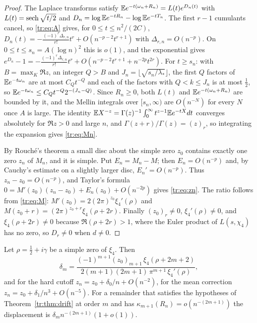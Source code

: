 \begin{proof}
The Laplace transforms satisfy $\mathbb{E} e^{-t(\omega_n+R_n)}=L(t)e^{D_n(t)}$ with $L(t)=\operatorname{sech}\sqrt{t/2}$ and $D_n=\log\mathbb{E} e^{-tR_n}-\log\mathbb{E} e^{-tT_n}$. The first $r-1$ cumulants cancel, so \eqref{tr:eq:A} gives, for $0\le t\le n^2/(2C)$, $D_n(t)=-\frac{(-1)^r\Delta_{r,n}}{r!}t^r+O(n^{-p-2}t^{r+1})$ with $\Delta_{r,n}=O(n^{-p})$. On $0\le t\le s_n=A(\log n)^2$ this is $o(1)$, and the exponential gives $e^{D_n}-1=-\frac{(-1)^r\Delta_{r,n}}{r!}t^r+O(n^{-p-2}t^{r+1}+n^{-2p}t^{2r})$. For $t\ge s_n$: with $B=\max_K\Re z$, an integer $Q>B$ and $J_n=\lfloor\sqrt{s_n/\lambda_*}\rfloor$, the first $Q$ factors of $\mathbb{E} e^{-t\omega_n}$ are at most $C_Qt^{-Q}$ and each of the factors with $Q<k\le J_n$ is at most $\frac12$, so $\mathbb{E} e^{-t\omega_n}\le C_Qt^{-Q}2^{-(J_n-Q)}$. Since $R_n\ge0$, both $L(t)$ and $\mathbb{E} e^{-t(\omega_n+R_n)}$ are bounded by it, and the Mellin integrals over $[s_n,\infty)$ are $O(n^{-N})$ for every $N$ once $A$ is large. The identity $\mathbb{E} X^{-z}=\Gamma(z)^{-1}\int_0^\infty t^{z-1}\mathbb{E} e^{-tX}dt$ converges absolutely for $\Re z>0$ and large $n$, and $\Gamma(z+r)/\Gamma(z)=(z)_r$, so integrating the expansion gives \eqref{tr:eq:Mn}.

By Rouch\'e's theorem a small disc about the simple zero $z_0$ contains exactly one zero $z_n$ of $M_n$, and it is simple. Put $E_n=M_n-M$; then $E_n=O(n^{-p})$ and, by Cauchy's estimate on a slightly larger disc, $E_n'=O(n^{-p})$. Thus $z_n-z_0=O(n^{-p})$, and Taylor's formula $0=M'(z_0)(z_n-z_0)+E_n(z_0)+O(n^{-2p})$ gives \eqref{tr:eq:zn}. The ratio follows from \eqref{tr:eq:M}: $M'(z_0)=2(2\pi)^{z_0}\xi_4'(\rho)$ and $M(z_0+r)=(2\pi)^{z_0+r}\xi_4(\rho+2r)$. Finally $(z_0)_r\ne0$, $\xi_4'(\rho)\ne0$, and $\xi_4(\rho+2r)\ne0$ because $\Re(\rho+2r)>1$, where the Euler product of $L(s,\chi_4)$ has no zero, so $D_r\ne0$ when $d\ne0$.
\end{proof}

\begin{corollary}\label{tr:cor:named}
Let $\rho=\frac12+i\gamma$ be a simple zero of $\xi_4$. Then
\begin{equation}\label{tr:eq:delta}
\delta_m=\frac{(-1)^{m+1}(z_0)_{m+1}\,\xi_4(\rho+2m+2)}{2(m+1)(2m+1)\,\pi^{m+1}\,\xi_4'(\rho)},
\end{equation}
and for the hard cutoff $z_n=z_0+\delta_0/n+O(n^{-2})$, for the mean correction $z_n=z_0+\delta_1/n^3+O(n^{-5})$. For a remainder that satisfies the hypotheses of Theorem~\ref{tr:thm:drift} at order $m$ and has $\kappa_{m+1}(R_n)=o(n^{-(2m+1)})$ the displacement is $\delta_m n^{-(2m+1)}(1+o(1))$.
\end{corollary}


